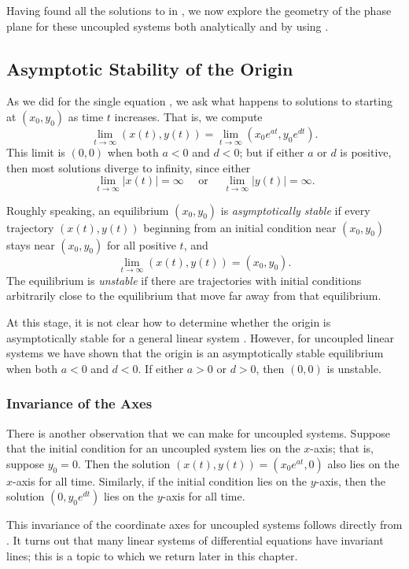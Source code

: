 \documentclass{ximera}
\begin{document}
Having found all the solutions to  in ,
we now explore the geometry of the phase plane for
these uncoupled systems both analytically and by using \Matlabp.


\subsection*{Asymptotic Stability of the Origin}

As we did for the single equation , we ask
what happens to solutions to  starting at $(x_0,y_0)$ as
time $t$ increases.  That is, we compute
\[
\lim_{t\to\infty}(x(t),y(t))=\lim_{t\to\infty}(x_0e^{a t},y_0e^{d t}).
\]
This limit is $(0,0)$ when both $a<0$ and $d<0$; but
if either $a$ or $d$ is positive, then most solutions diverge
to infinity, since either
\[
\lim_{t\to\infty}|x(t)| =\infty \quad \mbox{ or } \quad
\lim_{t\to\infty}|y(t)| =\infty.
\]


Roughly speaking, an equilibrium  $(x_0,y_0)$ is 
{\em asymptotically stable\/}  if every 
trajectory $(x(t),y(t))$ beginning from an initial condition near 
$(x_0,y_0)$ stays near $(x_0,y_0)$ for all positive $t$, and
\[
\lim_{t\to\infty}(x(t),y(t)) = (x_0,y_0).
\]
The equilibrium is {\em unstable\/}  if there are  
trajectories with initial conditions arbitrarily close to the 
equilibrium that move far away from that equilibrium.

At this stage, it is not clear how to determine whether the
origin is asymptotically stable for a general linear system
.  However, for uncoupled linear systems we
have shown that the origin is an asymptotically stable
equilibrium when both $a < 0$ and $d < 0$.  If either
$a >0$ or $d > 0$, then $(0,0)$ is unstable.

\subsubsection*{Invariance of the Axes}

There is another observation that we can make
for uncoupled systems.  Suppose that the initial condition for
an uncoupled system lies on the $x$-axis; that is, suppose $y_0=0$.
Then the solution $(x(t),y(t))=(x_0e^{at},0)$ also lies on the
$x$-axis for all time.  Similarly, if the initial condition lies
on the $y$-axis, then the solution $(0,y_0e^{dt})$ lies on the
$y$-axis for all time.

This invariance of the coordinate axes for uncoupled systems
follows directly from .  It turns out that
many linear systems of differential equations have invariant
lines; this is a topic to which we return later in this chapter.
\end{document}
